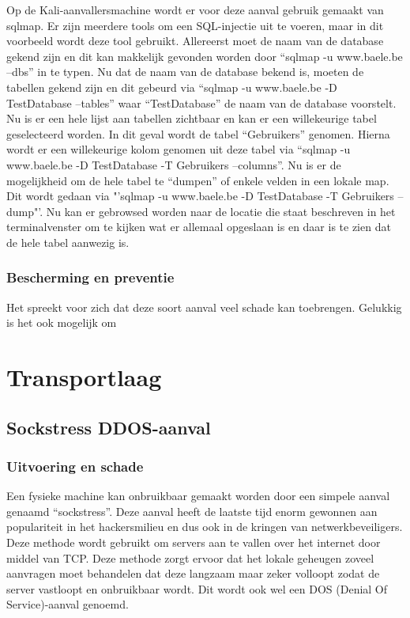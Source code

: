 \documentclass[pdftex,a4paper,12pt]{report}
\begin{document}
Op de Kali-aanvallersmachine wordt er voor deze aanval gebruik gemaakt van sqlmap. Er zijn meerdere tools om een SQL-injectie uit te voeren, maar in dit voorbeeld wordt deze tool gebruikt. Allereerst moet de naam van de database gekend zijn en dit kan makkelijk gevonden worden door "`sqlmap -u www.baele.be --dbs"' in te typen. Nu dat de naam van de database bekend is, moeten de tabellen gekend zijn en dit gebeurd via "`sqlmap -u www.baele.be -D TestDatabase --tables"' waar "`TestDatabase"' de naam van de database voorstelt. Nu is er een hele lijst aan tabellen zichtbaar en kan er een willekeurige tabel geselecteerd worden. In dit geval wordt de tabel "`Gebruikers"' genomen. Hierna wordt er een willekeurige kolom genomen uit deze tabel via "`sqlmap -u www.baele.be -D TestDatabase -T Gebruikers --columns"'. Nu is er de mogelijkheid om de hele tabel te "`dumpen"' of enkele velden in een lokale map. Dit wordt gedaan via "'sqlmap -u www.baele.be -D TestDatabase -T Gebruikers --dump"'. Nu kan er gebrowsed worden naar de locatie die staat beschreven in het terminalvenster om te kijken wat er allemaal opgeslaan is en daar is te zien dat de hele tabel aanwezig is.

\subsubsection{Bescherming en preventie}
Het spreekt voor zich dat deze soort aanval veel schade kan toebrengen. Gelukkig is het ook mogelijk om 

\section{Transportlaag}
\subsection{Sockstress DDOS-aanval}
\subsubsection{Uitvoering en schade}
Een fysieke machine kan onbruikbaar gemaakt worden door een simpele aanval genaamd "`sockstress"'. Deze aanval heeft de laatste tijd enorm gewonnen aan populariteit in het hackersmilieu en dus ook in de kringen van netwerkbeveiligers. Deze methode wordt gebruikt om servers aan te vallen over het internet door middel van TCP. Deze methode zorgt ervoor dat het lokale geheugen zoveel aanvragen moet behandelen dat deze langzaam maar zeker volloopt zodat de server vastloopt en onbruikbaar wordt. Dit wordt ook wel een DOS (Denial Of Service)-aanval genoemd. \newline 
\end{document}
